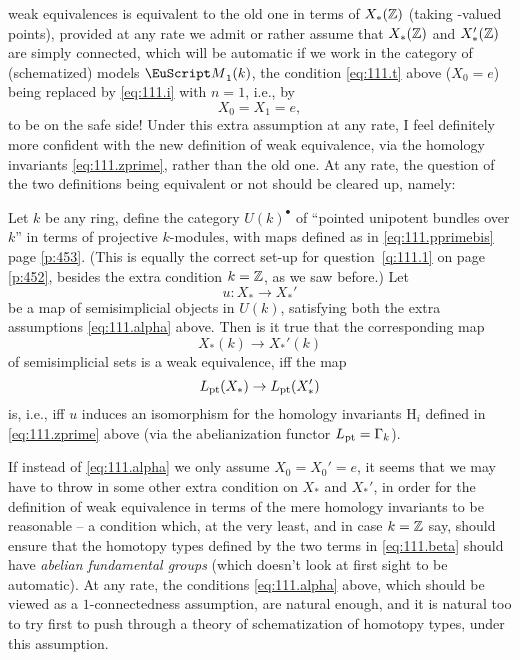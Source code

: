 weak equivalences is equivalent to the old one in terms of $X_*({\mathbb{Z}})$
(taking \bZ-valued points), provided at any rate we admit or rather
assume that $X_*({\mathbb{Z}})$ and $X_*'({\mathbb{Z}})$ are simply connected, which
will be automatic if we work in the category of (schematized) models
$\scrM_1(k)$, the condition \eqref{eq:111.t} above ($X_0=e$) being
replaced by \eqref{eq:111.i} with $n=1$, i.e., by
\begin{equation}
  \label{eq:111.alpha}
  X_0=X_1=e,\tag{$\alpha$}
\end{equation}
to be on the safe side! Under this extra assumption at any rate, I
feel definitely more confident with the new definition of weak
equivalence, via the homology invariants \eqref{eq:111.zprime}, rather
than the old one. At any rate, the question of the two definitions
being equivalent or not should be cleared up, namely:
\begin{questionnum}\label{q:111.2}
  Let $k$ be any ring, define the category $U(k)^\bullet$ of ``pointed
  unipotent bundles over $k$'' in terms of projective $k$-modules,
  with maps defined as in \eqref{eq:111.pprimebis} page
  \ref{p:453}. (This is equally the correct set-up for
  question~\ref{q:111.1} on page \ref{p:452}, besides the extra
  condition $k={\mathbb{Z}}$, as we saw before.) Let
  \[u:X_*\to X_*'\]
  be a map of semisimplicial objects in $U(k)$, satisfying both the
  extra assumptions \eqref{eq:111.alpha} above. Then is it true that
  the corresponding map
  \begin{equation}
    \label{eq:111.beta}
    X_*(k)\to X_*'(k)\tag{$\beta$}
  \end{equation}
  of semisimplicial sets is a weak equivalence, if{f} the map
  \[L_{\mathrm{pt}}(X_*)\to L_{\mathrm{pt}}(X_*')\]
  is, i.e., if{f} $u$ induces an isomorphism for the homology
  invariants $\mathrm H_i$ defined in \eqref{eq:111.zprime} above (via
  the abelianization functor $L_{\mathrm{pt}}=\Gamma_k$).
\end{questionnum}

If instead of \eqref{eq:111.alpha} we only assume $X_0=X_0'=e$, it
seems that we may have to throw in some other extra condition on $X_*$
and $X_*'$, in order for the definition of weak equivalence in terms
of the mere homology invariants to be reasonable -- a condition which,
at the very least, and in case $k={\mathbb{Z}}$ say, should ensure that the
homotopy types defined by the two terms in \eqref{eq:111.beta} should
have \emph{abelian fundamental groups} (which doesn't look at first
sight to be automatic). At any rate, the conditions
\eqref{eq:111.alpha} above, which should be viewed as a
$1$-connectedness assumption, are natural enough, and it is natural
too to try first to push through a theory of schematization of
homotopy types, under this assumption.

